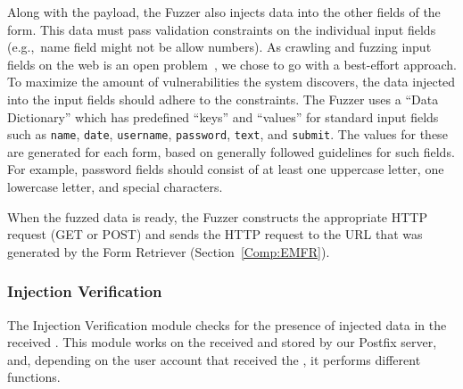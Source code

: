 
Along with the payload, the Fuzzer also injects data into the other fields of the form. This data must pass validation constraints on the individual input fields (e.g.,\ name field might not be allow numbers).  As crawling and fuzzing input fields on the web is an open problem~\cite{raghavan2000crawling}, we chose to go with a best-effort approach. To maximize the amount of vulnerabilities the system discovers, the data injected into the input fields should adhere to the constraints. The Fuzzer uses a ``Data Dictionary'' which has predefined ``keys'' and ``values'' for standard input fields such as \texttt{name}, \texttt{date}, \texttt{username}, \texttt{password}, \texttt{text}, and \texttt{submit}.
The values for these are generated for each form, based on generally followed guidelines for such fields. For example, password fields should consist of at least one uppercase letter, one lowercase letter, and special characters.

When the fuzzed data is ready, the Fuzzer constructs the appropriate HTTP request (GET or POST) and sends the HTTP request to the URL that was generated by the \Email Form Retriever (Section~\ref{Comp:EMFR}). 
\vspace{-1.5ex}

\subsubsection{Injection Verification}
\label{Comp:EMA}
The Injection Verification module checks for the presence of injected data in the received \emails. This module works on the \emails received and stored by our Postfix server, and, depending on the user account that received the \email, it performs different functions.

